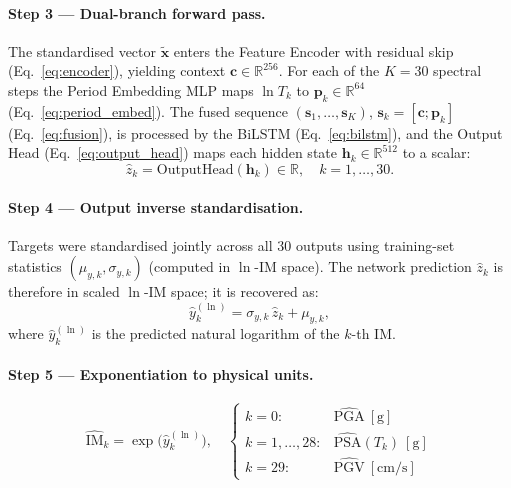 \documentclass[12pt,a4paper]{article}
\begin{document}
\paragraph{Step 3 — Dual-branch forward pass.}
The standardised vector $\tilde{\mathbf{x}}$ enters the Feature Encoder
with residual skip (Eq.~\ref{eq:encoder}), yielding context
$\mathbf{c}\in\mathbb{R}^{256}$.
For each of the $K=30$ spectral steps the Period Embedding MLP maps
$\ln T_k$ to $\mathbf{p}_k\in\mathbb{R}^{64}$ (Eq.~\ref{eq:period_embed}).
The fused sequence
$(\mathbf{s}_1,\ldots,\mathbf{s}_K)$, $\mathbf{s}_k=[\mathbf{c};\mathbf{p}_k]$
(Eq.~\ref{eq:fusion}),
is processed by the BiLSTM (Eq.~\ref{eq:bilstm}), and the Output Head
(Eq.~\ref{eq:output_head}) maps each hidden state
$\mathbf{h}_k\in\mathbb{R}^{512}$ to a scalar:
\begin{equation}
  \hat{z}_k = \mathrm{OutputHead}(\mathbf{h}_k) \in \mathbb{R},
  \quad k = 1,\ldots,30.
  \label{eq:scaled_output}
\end{equation}

\paragraph{Step 4 — Output inverse standardisation.}
Targets were standardised jointly across all 30 outputs using training-set
statistics $(\mu_{y,k}, \sigma_{y,k})$ (computed in $\ln$-IM space).
The network prediction $\hat{z}_k$ is therefore in scaled $\ln$-IM space;
it is recovered as:
\begin{equation}
  \hat{y}_k^{(\ln)} = \sigma_{y,k}\,\hat{z}_k + \mu_{y,k},
  \label{eq:inv_scale_y}
\end{equation}
where $\hat{y}_k^{(\ln)}$ is the predicted natural logarithm of the $k$-th IM.

\paragraph{Step 5 — Exponentiation to physical units.}
\begin{equation}
  \widehat{\mathrm{IM}}_k = \exp\!\bigl(\hat{y}_k^{(\ln)}\bigr),
  \quad
  \begin{cases}
    k = 0: & \widehat{\mathrm{PGA}}\ [\text{g}] \\
    k = 1,\ldots,28: & \widehat{\mathrm{PSA}}(T_k)\ [\text{g}] \\
    k = 29: & \widehat{\mathrm{PGV}}\ [\text{cm/s}]
  \end{cases}
  \label{eq:exponentiate}
\end{equation}
\end{document}
